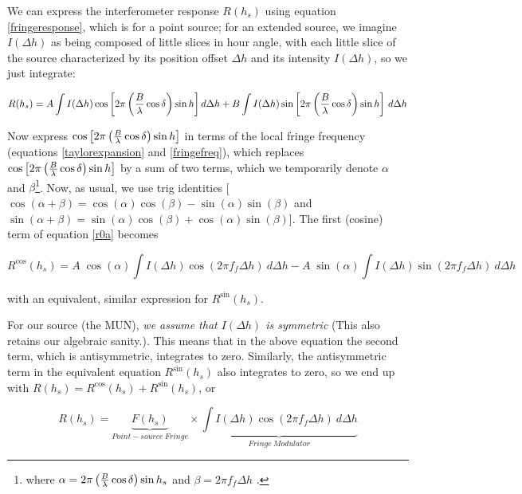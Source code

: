 \documentclass[11pt,preprint]{aastex}
\begin{document}
We can express the interferometer response $R(h_s)$ using equation
\ref{fringeresponse}, which is for a point source; for an extended source, we
imagine $I(\Delta h)$ as being composed of little slices in hour angle,
with each little slice of the source characterized by its position
offset $\Delta h$ and its intensity $I(\Delta h)$, so we just integrate:

\begin{equation} \label{r0a}
R(h_s) = A \int I(\Delta h) \cos \left[ 2\pi \left( {B \over \lambda}
	\cos\delta \right) \sin h\right] d \Delta h +  
	B \int I(\Delta h) \sin\left[ 2\pi \left( {B \over \lambda}
	\cos\delta \right) \sin h \right] \, d \Delta h
\end{equation} 

Now express $\cos \left[ 2\pi \left( {B \over \lambda} \cos\delta
\right) \sin h\right]$ in terms of the local fringe frequency (equations
\ref{taylorexpansion} and \ref{fringefreq}), which replaces $\cos \left[
2\pi \left( {B \over \lambda} \cos\delta \right) \sin h\right]$ by a sum
of two terms, which we temporarily denote $\alpha$ and
$\beta$\footnote{where $\alpha = 2 \pi \left( {B \over \lambda}
\cos\delta \right) \sin{h_s}$ and $\beta = 2 \pi f_f
\Delta h$ .}.  Now, as usual, we use trig identities [$\cos(\alpha +
\beta) = \cos(\alpha) \cos(\beta) - \sin(\alpha) \sin(\beta)$ and
$\sin(\alpha + \beta) = \sin(\alpha) \cos(\beta) + \cos(\alpha)
\sin(\beta)$]. The first (cosine) term of equation \ref{r0a} becomes

\begin{equation}
R^{\cos}(h_s) = A \; \cos(\alpha) \int I(\Delta h) \cos(2\pi f_f \Delta
h) \ d \Delta h 
-A \; \sin(\alpha) \int I(\Delta h) \sin(2\pi f_f \Delta
h) \ d \Delta h 
\end{equation}

\noindent with an equivalent, similar expression for $R^{\sin}(h_s)$.

For our source (the MUN), {\it we assume that $I(\Delta h)$ is
  symmetric} (This also retains our algebraic sanity.). This means that
in the above equation the second term, which is antisymmetric,
integrates to zero.  Similarly, the antisymmetric term in the equivalent
equation $R^{\sin}(h_s)$ also integrates to zero, so we end up with
$R(h_s) = R^{\cos}(h_s) + R^{\sin}(h_s)$, or

\begin{equation} \label{interfeqn}
R(h_s) = \underbrace{ F(h_s)}_{Point-source\ 
Fringe} \times 
\underbrace{\int I(\Delta h) \cos( 2\pi f_f \Delta h) \  d \Delta h}_{Fringe \ Modulator} 
\end{equation}
\end{document}
